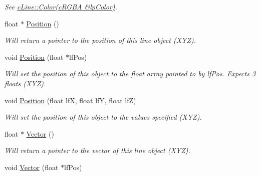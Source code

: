 \begin{DoxyCompactItemize}
\begin{DoxyCompactList}\small\item\em See \hyperlink{classc_line_a06c260e9319257479988f3867ad12d0e}{cLine::Color(cRGBA \&lpColor)}. \end{DoxyCompactList}\item 
\hypertarget{classc_line_a32342ae3b470044b21f38f3fe3e0c232}{
float $\ast$ \hyperlink{classc_line_a32342ae3b470044b21f38f3fe3e0c232}{Position} ()}
\label{classc_line_a32342ae3b470044b21f38f3fe3e0c232}

\begin{DoxyCompactList}\small\item\em Will return a pointer to the position of this line object (XYZ). \end{DoxyCompactList}\item 
\hypertarget{classc_line_acfefe5128253475e8291d110f004095b}{
void \hyperlink{classc_line_acfefe5128253475e8291d110f004095b}{Position} (float $\ast$lfPos)}
\label{classc_line_acfefe5128253475e8291d110f004095b}

\begin{DoxyCompactList}\small\item\em Will set the position of this object to the float array pointed to by lfPos. Expects 3 floats (XYZ). \end{DoxyCompactList}\item 
\hypertarget{classc_line_a6abc4fedc3f30a6fb45ce4dd83070082}{
void \hyperlink{classc_line_a6abc4fedc3f30a6fb45ce4dd83070082}{Position} (float lfX, float lfY, float lfZ)}
\label{classc_line_a6abc4fedc3f30a6fb45ce4dd83070082}

\begin{DoxyCompactList}\small\item\em Will set the position of this object to the values specified (XYZ). \end{DoxyCompactList}\item 
\hypertarget{classc_line_a4b37bd0ff6ea3834a2c49d5efbd222c9}{
float $\ast$ \hyperlink{classc_line_a4b37bd0ff6ea3834a2c49d5efbd222c9}{Vector} ()}
\label{classc_line_a4b37bd0ff6ea3834a2c49d5efbd222c9}

\begin{DoxyCompactList}\small\item\em Will return a pointer to the vector of this line object (XYZ). \end{DoxyCompactList}\item 
\hypertarget{classc_line_ad558bfa28a78a6594446ae0c5e11c262}{
void \hyperlink{classc_line_ad558bfa28a78a6594446ae0c5e11c262}{Vector} (float $\ast$lfPos)}
\label{classc_line_ad558bfa28a78a6594446ae0c5e11c262}


\end{DoxyCompactItemize}
